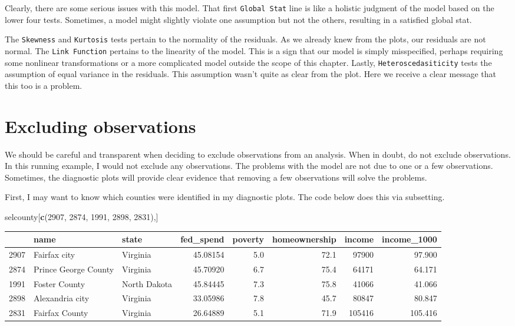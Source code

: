 \documentclass[
]{book}
\makeatletter
\newenvironment{Shaded}{\begin{snugshade}}{\end{snugshade}}
\newcommand{\DecValTok}[1]{\textcolor[rgb]{0.06,0.06,0.06}{#1}}
\newcommand{\FunctionTok}[1]{\textcolor[rgb]{0.27,0.27,0.27}{\textbf{#1}}}
\newcommand{\NormalTok}[1]{#1}
\newenvironment{kframe}{%
\medskip{}
\setlength{\fboxsep}{.8em}
 \def\at@end@of@kframe{}%
 \ifinner\ifhmode%
  \def\at@end@of@kframe{\end{minipage}}%
  \begin{minipage}{\columnwidth}%
 \fi\fi%
 \def\FrameCommand##1{\hskip\@totalleftmargin \hskip-\fboxsep
 \colorbox{shadecolor}{##1}\hskip-\fboxsep
     \hskip-\linewidth \hskip-\@totalleftmargin \hskip\columnwidth}%
 \MakeFramed {\advance\hsize-\width
   \@totalleftmargin\z@ \linewidth\hsize
   \@setminipage}}%
 {\par\unskip\endMakeFramed%
 \at@end@of@kframe}
\renewenvironment{Shaded}{\begin{kframe}}{\end{kframe}}
\makeatother
\begin{document}
Clearly, there are some serious issues with this model. That first \texttt{Global\ Stat} line is like a holistic judgment of the model based on the lower four tests. Sometimes, a model might slightly violate one assumption but not the others, resulting in a satisfied global stat.

The \texttt{Skewness} and \texttt{Kurtosis} tests pertain to the normality of the residuals. As we already knew from the plots, our residuals are not normal. The \texttt{Link\ Function} pertains to the linearity of the model. This is a sign that our model is simply misspecified, perhaps requiring some nonlinear transformations or a more complicated model outside the scope of this chapter. Lastly, \texttt{Heteroscedasiticity} tests the assumption of equal variance in the residuals. This assumption wasn't quite as clear from the plot. Here we receive a clear message that this too is a problem.

\hypertarget{excluding-observations}{%
\section{Excluding observations}\label{excluding-observations}}

We should be careful and transparent when deciding to exclude observations from an analysis. When in doubt, do not exclude observations. In this running example, I would not exclude any observations. The problems with the model are not due to one or a few observations. Sometimes, the diagnostic plots will provide clear evidence that removing a few observations will solve the problems.

First, I may want to know which counties were identified in my diagnostic plots. The code below does this via subsetting.

\begin{Shaded}
\begin{Highlighting}[]
\NormalTok{selcounty[}\FunctionTok{c}\NormalTok{(}\DecValTok{2907}\NormalTok{, }\DecValTok{2874}\NormalTok{, }\DecValTok{1991}\NormalTok{, }\DecValTok{2898}\NormalTok{, }\DecValTok{2831}\NormalTok{),]}
\end{Highlighting}
\end{Shaded}

\begin{tabular}{l|l|l|r|r|r|r|r}
\hline
  & name & state & fed\_spend & poverty & homeownership & income & income\_1000\\
\hline
2907 & Fairfax city & Virginia & 45.08154 & 5.0 & 72.1 & 97900 & 97.900\\
\hline
2874 & Prince George County & Virginia & 45.70920 & 6.7 & 75.4 & 64171 & 64.171\\
\hline
1991 & Foster County & North Dakota & 45.84445 & 7.3 & 75.8 & 41066 & 41.066\\
\hline
2898 & Alexandria city & Virginia & 33.05986 & 7.8 & 45.7 & 80847 & 80.847\\
\hline
2831 & Fairfax County & Virginia & 26.64889 & 5.1 & 71.9 & 105416 & 105.416\\
\hline
\end{tabular}
\end{document}
